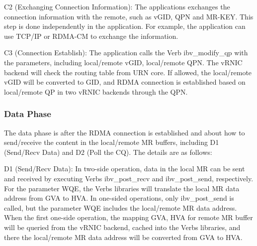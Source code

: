 C2 (Exchanging Connection Information): The applications exchanges the connection information with the remote, such as vGID, QPN and MR-KEY. This step is done independently in the application. For example, the application can use TCP/IP or RDMA-CM to exchange the information.

C3 (Connection Establish): The application calls the Verb ibv\_modify\_qp with the parameters, including local/remote vGID, local/remote QPN. The vRNIC backend will check the routing table from URN core. If allowed, the local/remote vGID will be converted to GID, and RDMA connection is established based on local/remote QP in two vRNIC backends through the QPN. 

\subsubsection{Data Phase}
The data phase is after the RDMA connection is established and about how to send/receive the content in the local/remote MR buffers, including D1 (Send/Recv Data) and D2 (Poll the CQ). The details are as follows:

D1 (Send/Recv Data): In two-side operation, data in the local MR can be sent and received by executing Verbs ibv\_post\_recv and ibv\_post\_send, respectively. For the parameter WQE, the Verbs libraries will translate the local MR data address from GVA to HVA. In one-sided operations, only ibv\_post\_send is called, but the parameter WQE includes the local/remote MR data address. When the first one-side operation, the mapping {GVA, HVA} for remote MR buffer will be queried from the vRNIC backend, cached into the Verbs libraries, and there the local/remote MR data address will be converted from GVA to HVA.

